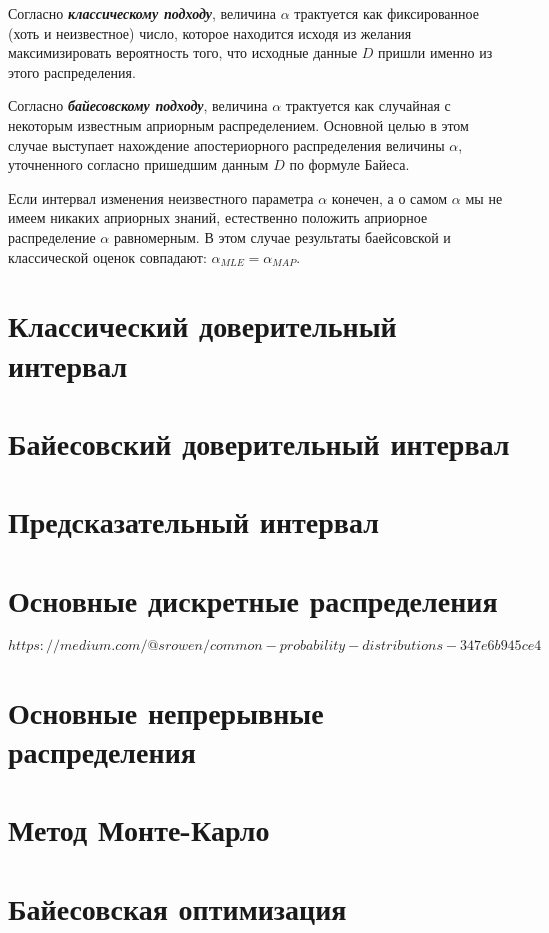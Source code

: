Согласно \textbf{\textit{классическому подходу}}, величина $\alpha$ трактуется как фиксированное (хоть и неизвестное) число, которое находится исходя из желания максимизировать вероятность того, что исходные данные $D$ пришли именно из этого распределения.

Согласно \textbf{\textit{байесовскому подходу}}, величина $\alpha$ трактуется как случайная с некоторым известным априорным распределением. Основной целью в этом случае выступает нахождение апостериорного распределения величины $\alpha$, уточненного согласно пришедшим данным $D$ по формуле Байеса.

Если интервал изменения неизвестного параметра $\alpha$ конечен, а о самом $\alpha$ мы не имеем никаких априорных знаний, естественно положить априорное распределение $\alpha$ равномерным. В этом случае результаты баейсовской и классической оценок совпадают: $\alpha_{MLE} = \alpha_{MAP}$.


\section{Классический доверительный интервал}


\section{Байесовский доверительный интервал}


\section{Предсказательный интервал}


\section{Основные дискретные распределения}

$https://medium.com/@srowen/common-probability-distributions-347e6b945ce4$


\section{Основные непрерывные распределения}


\section{Метод Монте-Карло}


\section{Байесовская оптимизация}


